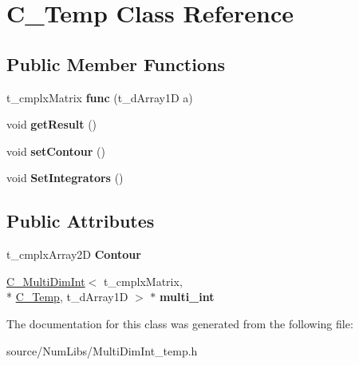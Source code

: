 \hypertarget{class_c___temp}{\section{C\-\_\-\-Temp Class Reference}
\label{class_c___temp}
}
\subsection*{Public Member Functions}
\begin{DoxyCompactItemize}
\item 
\hypertarget{class_c___temp_a57241a03facc3d2e7253c185a1c2692d}{t\-\_\-cmplx\-Matrix {\bfseries func} (t\-\_\-d\-Array1\-D a)}\label{class_c___temp_a57241a03facc3d2e7253c185a1c2692d}

\item 
\hypertarget{class_c___temp_a05c48e8b7d40e78cb5b5ceb22e55b2e8}{void {\bfseries get\-Result} ()}\label{class_c___temp_a05c48e8b7d40e78cb5b5ceb22e55b2e8}

\item 
\hypertarget{class_c___temp_a34d04bea54910921e30d0a8c0a2ac36c}{void {\bfseries set\-Contour} ()}\label{class_c___temp_a34d04bea54910921e30d0a8c0a2ac36c}

\item 
\hypertarget{class_c___temp_a1fcb2a40efa15b42861d20f63881feb5}{void {\bfseries Set\-Integrators} ()}\label{class_c___temp_a1fcb2a40efa15b42861d20f63881feb5}

\end{DoxyCompactItemize}
\subsection*{Public Attributes}
\begin{DoxyCompactItemize}
\item 
\hypertarget{class_c___temp_a2b649d3c8851eeebf1b14dbdac6f0079}{t\-\_\-cmplx\-Array2\-D {\bfseries Contour}}\label{class_c___temp_a2b649d3c8851eeebf1b14dbdac6f0079}

\item 
\hypertarget{class_c___temp_a4f8915a4bdfb7d1c5725b6ee388bf674}{\hyperlink{class_c___multi_dim_int}{C\-\_\-\-Multi\-Dim\-Int}$<$ t\-\_\-cmplx\-Matrix, \\*
\hyperlink{class_c___temp}{C\-\_\-\-Temp}, t\-\_\-d\-Array1\-D $>$ $\ast$ {\bfseries multi\-\_\-int}}\label{class_c___temp_a4f8915a4bdfb7d1c5725b6ee388bf674}

\end{DoxyCompactItemize}


The documentation for this class was generated from the following file\-:\begin{DoxyCompactItemize}
\item 
source/\-Num\-Libs/Multi\-Dim\-Int\-\_\-temp.\-h\end{DoxyCompactItemize}

